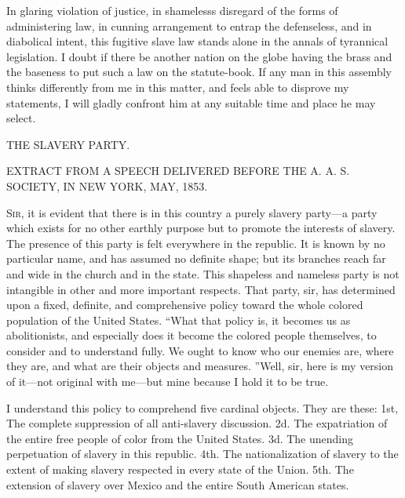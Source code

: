 In glaring violation of justice, in shamelesss disregard of the forms of
administering law, in cunning arrangement to entrap the {}defenseless,
and in diabolical intent, this fugitive slave law stands alone in the
annals of tyrannical legislation. I doubt if there be another nation on
the globe having the brass and the baseness to put such a law on the
statute-book. If any man in this assembly thinks differently from me in
this matter, and feels able to disprove my statements, I will gladly
confront him at any suitable time and place he may select.

{\protect\hypertarget{ux5cux7bux5cux7bux5cux7b1ux5cux7dux5cux7dux5cux7d}{}{}}

{}

{THE SLAVERY PARTY.}

{EXTRACT FROM A SPEECH DELIVERED BEFORE THE A. A. S. SOCIETY, IN NEW
YORK, MAY, 1853.}

\textsc{Sir}, it is evident that there is in this country a purely
slavery party---a party which exists for no other earthly purpose but to
promote the interests of slavery. The presence of this party is felt
everywhere in the republic. It is known by no particular name, and has
assumed no definite shape; but its branches reach far and wide in the
church and in the state. This shapeless and nameless party is not
intangible in other and more important respects. That party, sir, has
determined upon a fixed, definite, and comprehensive policy toward the
whole colored population of the United States. ``What that policy is, it
becomes us as abolitionists, and especially does it become the colored
people themselves, to consider and to understand fully. We ought to know
who our enemies are, where they are, and what are their objects and
measures. ''Well, sir, here is my version of it---not original with
me---but mine because I hold it to be true.

I understand this policy to comprehend five cardinal objects. They are
these: 1st, The complete suppression of all anti-slavery discussion. 2d.
The expatriation of the entire free people of color from the United
States. 3d. The unending perpetuation of slavery in this republic. 4th.
The nationalization of slavery to the extent of making slavery respected
in every state of the Union. 5th. The extension of slavery over Mexico
and the entire South American states.

